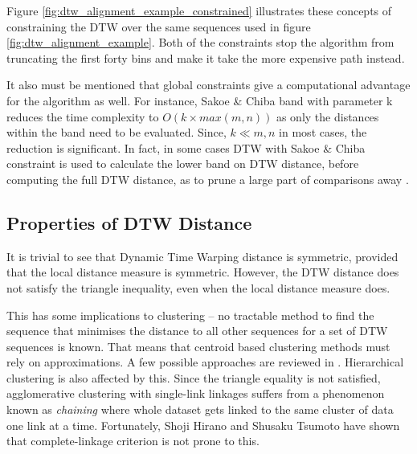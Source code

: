 \documentclass[12pt,a4paper]{article}
\begin{document}
Figure \ref{fig:dtw_alignment_example_constrained} illustrates these concepts
of constraining the DTW over the same sequences used in figure
\ref{fig:dtw_alignment_example}. Both of the constraints stop the algorithm
from truncating the first forty bins and make it take the more expensive path
instead.

It also must be mentioned that global constraints give a computational
advantage for the algorithm as well. For instance, Sakoe \& Chiba band with
parameter k reduces the time complexity to $O(k \times max(m, n))$ as only the
distances within the band need to be evaluated. Since, $k \ll m,n$ in most
cases, the reduction is significant. In fact, in some 
cases DTW with Sakoe \& Chiba constraint is used to calculate the lower band on
DTW distance, before computing the full DTW distance, as to prune a large part of 
comparisons away \cite{Ratanamahatana:2004wu}.

\subsection{Properties of DTW Distance}

It is trivial to see that Dynamic Time Warping distance is symmetric, provided
that the local distance measure is symmetric. However, the DTW distance does
not satisfy the triangle inequality, even when the local distance measure
does\cite{Muller:2007bo,Niennattrakul:2007wv}.

This has some implications to clustering -- no tractable method to find the
sequence that minimises the distance to all other sequences for a set of DTW
sequences is known. That means that centroid based clustering methods must rely
on approximations. A few possible approaches are reviewed in
\cite{Niennattrakul:2007wv,Petitjean:2011bq}.  Hierarchical clustering is also
affected by this. Since the triangle equality is not satisfied, agglomerative
clustering with single-link linkages suffers from a phenomenon known as
\emph{chaining} where whole dataset gets linked to the same cluster of data one
link at a time. Fortunately, Shoji Hirano and Shusaku Tsumoto have shown that
complete-linkage criterion is not prone to this\cite{Hirano:2005wh}. 
\end{document}
